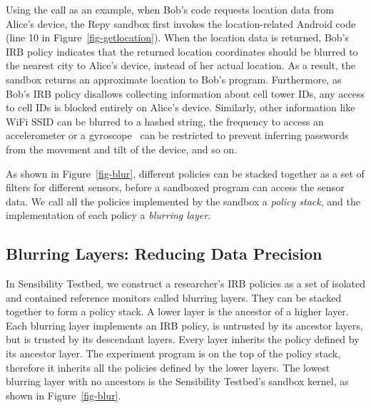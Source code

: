 Using the  call as an example, 
when Bob's code requests location data from Alice's device, the Repy sandbox first
invokes the location-related Android code (line 10 in Figure~\ref{fig-getlocation}). 
When the location data is returned, Bob's IRB policy
indicates that the returned location coordinates should be blurred to the nearest city to Alice's
device, instead of her actual location. As a result, the sandbox returns an approximate location to
Bob's program. Furthermore, as Bob's IRB policy disallows collecting information about cell tower
IDs, any access to cell IDs is blocked entirely on Alice's device. Similarly, other information
like WiFi SSID can be blurred to a hashed string, the frequency to access an accelerometer or a
gyroscope~\cite{michalevsky2014gyrophone} can be restricted to prevent inferring passwords from the
movement and tilt of the device, and so on. 

As shown in Figure~\ref{fig-blur}, different policies
can be stacked together as a set of filters for different sensors, before a sandboxed program can
access the sensor data. We call all the policies implemented by the sandbox a \textit{policy stack}, 
and the implementation of each policy a \textit{blurring layer}.

\subsection{Blurring Layers: Reducing Data Precision}\label{sec-layer}


In Sensibility Testbed, we construct a researcher's IRB policies as a set of 
isolated and contained reference monitors called blurring layers. They can 
be stacked together to form a policy stack. A lower layer is the ancestor of 
a higher layer. Each 
blurring layer implements an IRB policy, is untrusted by its ancestor layers, 
but is trusted by its descendant layers. Every layer inherits the policy 
defined by its ancestor layer. The experiment program is on the top 
of the policy stack, therefore it inherits all the policies defined by the
lower layers. The lowest blurring layer with no ancestors is the 
Sensibility Testbed's sandbox kernel, as shown in Figure~\ref{fig-blur}. 

